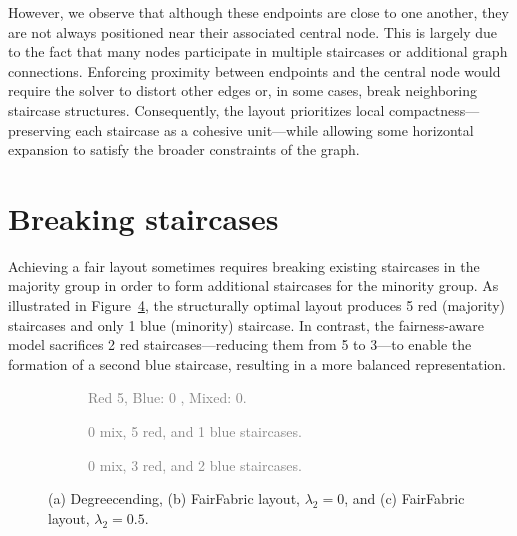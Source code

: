 \documentclass[onecolumn]{egpubl}
\newcommand{\FairFabric}{\textsf{FairFabric}\xspace}
\begin{document}
However, we observe that although these endpoints are close to one another, they are not always positioned near their associated central node. This is largely due to the fact that many nodes participate in multiple staircases or additional graph connections. Enforcing proximity between endpoints and the central node would require the solver to distort other edges or, in some cases, break neighboring staircase structures. Consequently, the layout prioritizes local compactness—preserving each staircase as a cohesive unit—while allowing some horizontal expansion to satisfy the broader constraints of the graph. 

\section{Breaking staircases}
\label{sec:breaking}

Achieving a fair layout sometimes requires breaking existing staircases in the majority group in order to form additional staircases for the minority group. As illustrated in Figure~\ref{fig:keyFind}, the structurally optimal layout produces 5 red (majority) staircases and only 1 blue (minority) staircase. In contrast, the fairness-aware model sacrifices 2 red staircases—reducing them from 5 to 3—to enable the formation of a second blue staircase, resulting in a more balanced representation.

\begin{figure}[htbp]
    \centering
    \sffamily
    \fontsize{8}{9}\selectfont
    \vspace{0.5em}

    \begin{subfigure}[b]{0.31\linewidth}
        \centering
        
        \vspace{0.3em}
        \caption{\textcolor{gray}{Red 5, Blue: 0 , Mixed: 0.}}
        \label{fig:keyFindde}
    \end{subfigure}
    \hfill
    \begin{subfigure}[b]{0.31\linewidth}
        \centering
        
        \vspace{0.3em}
        \caption{\textcolor{gray}{0 mix, 5 red, and 1 blue staircases.}}
        \label{fig:keyFindopt}
    \end{subfigure}
    \hfill
    \begin{subfigure}[b]{0.31\linewidth}
        \centering
        
        \vspace{0.3em}
        \caption{\textcolor{gray}{0 mix, 3 red, and 2 blue staircases.}}
        \label{fig:keyFindfair}
    \end{subfigure}

    \vspace{0.5em}
    \normalsize
    \caption{(a) Degreecending, (b) \FairFabric layout, $\lambda_2 = 0$, and (c) \FairFabric layout, $\lambda_2 = 0.5$.}
    \label{fig:keyFind}
\end{figure}
\end{document}
